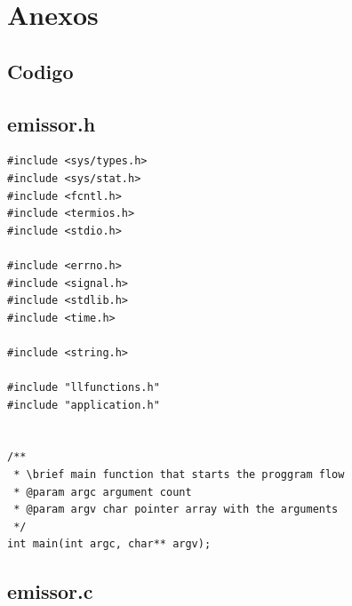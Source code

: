 \documentclass{article}
\begin{document}
\section{Anexos}

\subsection{Codigo}

\subsection{emissor.h}
\begin{lstlisting}[style=CStyle]
#include <sys/types.h>
#include <sys/stat.h>
#include <fcntl.h>
#include <termios.h>
#include <stdio.h>

#include <errno.h>
#include <signal.h>
#include <stdlib.h>
#include <time.h>

#include <string.h>

#include "llfunctions.h"
#include "application.h"


/**
 * \brief main function that starts the proggram flow
 * @param argc argument count
 * @param argv char pointer array with the arguments
 */
int main(int argc, char** argv);

\end{lstlisting}

\subsection{emissor.c}
\end{document}
